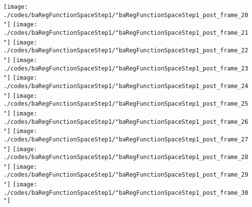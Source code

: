 \begin{frame}{\insertsection}
\begin{center}
{\begin{animateinline}{15}
				 \texttt{[image: ./codes/baRegFunctionSpaceStep1/"baRegFunctionSpaceStep1\_post\_frame\_20"]}\newframe
				 \texttt{[image: ./codes/baRegFunctionSpaceStep1/"baRegFunctionSpaceStep1\_post\_frame\_21"]}\newframe
				 \texttt{[image: ./codes/baRegFunctionSpaceStep1/"baRegFunctionSpaceStep1\_post\_frame\_22"]}\newframe
				 \texttt{[image: ./codes/baRegFunctionSpaceStep1/"baRegFunctionSpaceStep1\_post\_frame\_23"]}\newframe
				 \texttt{[image: ./codes/baRegFunctionSpaceStep1/"baRegFunctionSpaceStep1\_post\_frame\_24"]}\newframe
				 \texttt{[image: ./codes/baRegFunctionSpaceStep1/"baRegFunctionSpaceStep1\_post\_frame\_25"]}\newframe
				 \texttt{[image: ./codes/baRegFunctionSpaceStep1/"baRegFunctionSpaceStep1\_post\_frame\_26"]}\newframe
				 \texttt{[image: ./codes/baRegFunctionSpaceStep1/"baRegFunctionSpaceStep1\_post\_frame\_27"]}\newframe
				 \texttt{[image: ./codes/baRegFunctionSpaceStep1/"baRegFunctionSpaceStep1\_post\_frame\_28"]}\newframe
				 \texttt{[image: ./codes/baRegFunctionSpaceStep1/"baRegFunctionSpaceStep1\_post\_frame\_29"]}\newframe
				 \texttt{[image: ./codes/baRegFunctionSpaceStep1/"baRegFunctionSpaceStep1\_post\_frame\_30"]}
			 \end{animateinline}
			}
	\end{center}
    
\end{frame}


